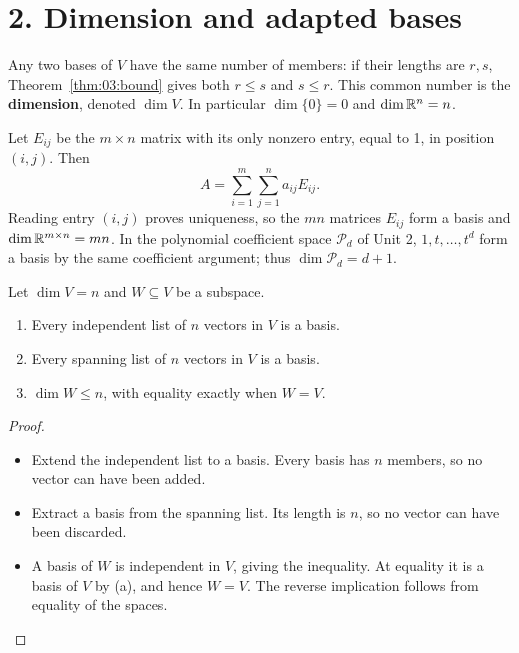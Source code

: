 \section*{2. Dimension and adapted bases}

Any two bases of \(V\) have the same number of members:
if their lengths are \(r,s\), Theorem~\ref{thm:03:bound} gives both
\(r\leqslant s\) and \(s\leqslant r\).
This common number is the \textbf{dimension}, denoted \(\dim V\).
In particular \(\dim\{0\}=0\) and \(\dim\mathbb R^n=n\).

Let \(E_{ij}\) be the \(m\times n\) matrix with its only nonzero entry,
equal to 1, in position \((i,j)\). Then
\[
A=\sum_{i=1}^m\sum_{j=1}^n a_{ij}E_{ij}.
\]
Reading entry \((i,j)\) proves uniqueness, so the \(mn\) matrices \(E_{ij}\)
form a basis and \(\dim\mathbb R^{m\times n}=mn\).
In the polynomial coefficient space \(\mathcal P_d\) of Unit 2,
\(1,t,\ldots,t^d\) form a basis by the same coefficient argument;
thus \(\dim\mathcal P_d=d+1\).

\begin{proposition}\label{prop:03:dimension-tests}
Let \(\dim V=n\) and \(W\subseteq V\) be a subspace.
\begin{enumerate}
\item Every independent list of \(n\) vectors in \(V\) is a basis.
\item Every spanning list of \(n\) vectors in \(V\) is a basis.
\item \(\dim W\leqslant n\), with equality exactly when \(W=V\).
\end{enumerate}
\end{proposition}
\begin{proof}
\begin{itemize}
\item Extend the independent list to a basis. Every basis has \(n\)
members, so no vector can have been added.
\item Extract a basis from the spanning list. Its length is \(n\), so
no vector can have been discarded.
\item A basis of \(W\) is independent in \(V\), giving the inequality.
At equality it is a basis of \(V\) by (a), and hence \(W=V\).
The reverse implication follows from equality of the spaces.
\end{itemize}
\end{proof}


